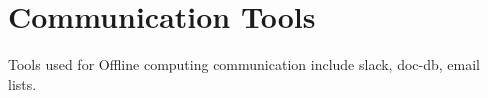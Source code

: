 \section{Communication Tools}
Tools used for Offline computing communication include slack, doc-db, email lists.
